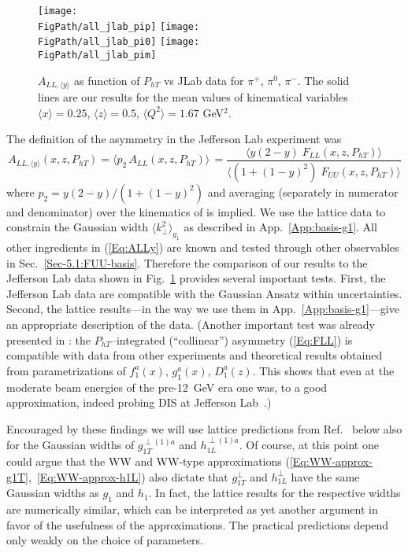 \documentclass[a4paper,11pt]{article}
\newcommand{\be}{\begin{equation}}
\newcommand{\ee}{\end{equation}}
\newcommand{\la}{\langle}
\newcommand{\ra}{\rangle}
\def\Phperp{P_{hT}}
\def\kperp{k_\perp}
\newcommand*{\FigPath}{./figs}%
\begin{document}
\begin{figure}[b]
\centering 
\texttt{[image: \\FigPath/all\_jlab\_pip]}  
\texttt{[image: \\FigPath/all\_jlab\_pi0]}  
\texttt{[image: \\FigPath/all\_jlab\_pim]} 
\caption{\label{jlab_ALL} 
	$A_{LL,\la y\ra}$ as function of $P_{hT}$ vs 
	JLab data \cite{Avakian:2010ae}
 	for $\pi^+$, $\pi^0$, $\pi^-$. The solid lines are 
	our results for the mean values of kinematical variables
	$\langle x \rangle = 0.25$, 
	$\langle z \rangle = 0.5$, $\langle Q^2 \rangle = 1.67$ GeV$^2$.
}
\end{figure}

The definition of the asymmetry in  the Jefferson Lab experiment \cite{Avakian:2010ae} 
was
\be\label{Eq:ALLy}
	A_{LL,\la y\ra}(x,z,\Phperp) 
	= \la p_2 \,A_{LL}(x,z,\Phperp) \ra \, 
	= \frac{\la y (2-y) \; F_{LL}(x,z,\Phperp)\ra}
	{\la(1+(1-y)^2) \; F_{UU}(x,z,\Phperp)\ra} 
\ee 
where $p_2 = y (2-y)/(1+(1-y)^2)$ and averaging (separately in numerator 
and denominator) over the kinematics of \cite{Avakian:2010ae} is implied. 
We use the lattice data \cite{Hagler:2009mb} to
constrain the Gaussian width $\la\kperp^2\ra_{g_1}$ as described in 
App.~\ref{App:basis-g1}. All other ingredients in (\ref{Eq:ALLy}) are known 
and tested through other observables in Sec.~\ref{Sec-5.1:FUU-basis}.
Therefore the comparison of our results to the Jefferson Lab data \cite{Avakian:2010ae} 
shown in Fig.~\ref{jlab_ALL} provides several important tests.
First, the Jefferson Lab data \cite{Avakian:2010ae} are compatible
with the Gaussian Ansatz within uncertainties. Second, the lattice 
results---in the way we use them in App.~\ref{App:basis-g1}---give an appropriate 
description of the data.
	(Another important test was already presented in 
	\cite{Avakian:2010ae}: the $\Phperp$--integrated (``collinear'')
	asymmetry (\ref{Eq:FLL}) is compatible with data
	from other experiments and theoretical results obtained from
	parametrizations of $f_1^a(x)$, $g_1^a(x)$, $D_1^a(z)$. This 
	shows that even at the moderate beam energies of the pre-12~GeV 
	era one was, to a good approximation, indeed probing DIS at 
	Jefferson Lab~\cite{Avakian:2010ae}.)


Encouraged by these findings we will use lattice predictions from 
Ref.~\cite{Hagler:2009mb} below also for the Gaussian widths of 
$g_{1T}^{\perp(1)a}$ and $h_{1L}^{\perp(1)a}$.
Of course, at this point one could argue that the WW and WW-type 
approximations (\ref{Eq:WW-approx-g1T},~\ref{Eq:WW-approx-h1L}) also
dictate that $g_{1T}^\perp$ and $h_{1L}^\perp$ have the same Gaussian
widths as $g_1$ and $h_1$. In fact, the lattice results for the 
respective widths are numerically similar, which can be interpreted as 
yet another argument in favor of the usefulness of the approximations. 
The practical predictions depend only weakly on the choice of parameters.
\end{document}

